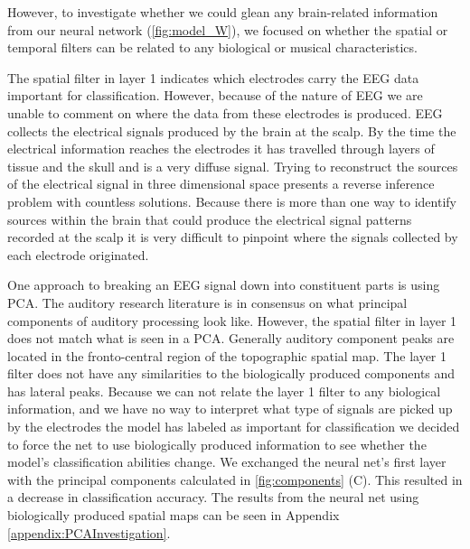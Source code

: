 However, to investigate whether we could glean any brain-related information from our neural network (\autoref{fig:model_W}), we focused on whether the spatial or temporal filters can be related to any biological or musical characteristics.

The spatial filter in layer 1 indicates which electrodes carry the \ac{EEG} data important for classification. 
However, because of the nature of \ac{EEG} we are unable to comment on where the data from these electrodes is produced.
\ac{EEG} collects the electrical signals produced by the brain at the scalp. 
By the time the electrical information reaches the electrodes it has travelled through layers of tissue and the skull and is a very diffuse signal. 
Trying to reconstruct the sources of the electrical signal in three dimensional space presents a reverse inference problem with countless solutions.
Because there is more than one way to identify sources within the brain that could produce the electrical signal patterns recorded at the scalp it is very difficult to pinpoint where the signals collected by each electrode originated.

One approach to breaking an EEG signal down into constituent parts is using \ac{PCA}.
The auditory research literature is in consensus on what principal components of auditory processing look like.
However, the spatial filter in layer 1 does not match what is seen in a \ac{PCA}. 
Generally auditory component peaks are located in the fronto-central region of the topographic spatial map. 
The layer 1 filter does not have any similarities to the biologically produced components and has lateral peaks. 
Because we can not relate the layer 1 filter to any biological information, and we have no way to interpret what type of signals are picked up by the electrodes the model has labeled as important for classification we decided to force the net to use biologically produced information to see whether the model's classification abilities change. 
We exchanged the neural net's first layer with the principal components calculated in \autoref{fig:components} (C). 
This resulted in a decrease in classification accuracy. The results from the neural net using biologically produced spatial maps can be seen in Appendix \ref{appendix:PCAInvestigation}.

